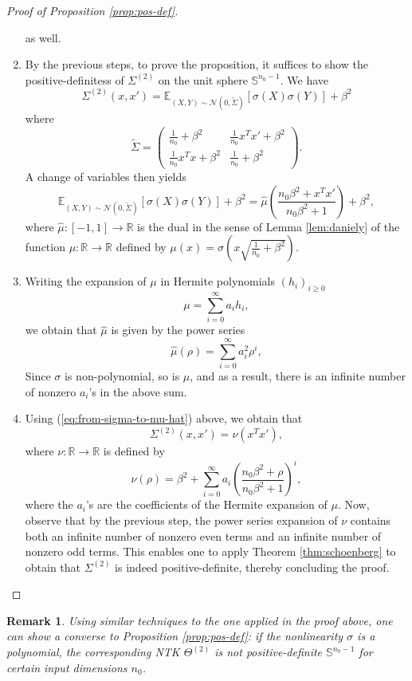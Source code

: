 \documentclass{article}
\newtheorem{rem}{Remark}
\begin{document}
\begin{proof}[Proof of Proposition \ref{prop:pos-def}]
\begin{enumerate}
as well.
\item By the previous steps, to prove the proposition, it suffices to show
the positive-definitess of $\Sigma^{\left(2\right)}$ on the unit
sphere $\mathbb{S}^{n_{0}-1}$. We have
\[
\Sigma^{\left(2\right)}\left(x,x'\right)=\mathbb{E}_{\left(X,Y\right)\sim\mathcal{N}\left(0,\tilde{\Sigma}\right)}\left[\sigma\left(X\right)\sigma\left(Y\right)\right]+\beta^{2}
\]
where 
\[
\tilde{\Sigma}=\left(\begin{array}{cc}
\frac{1}{n_{0}}+\beta^{2} & \frac{1}{n_{0}}x^{T}x'+\beta^{2}\\
\frac{1}{n_{0}}x^{T}x+\beta^{2} & \frac{1}{n_{0}}+\beta^{2}
\end{array}\right).
\]
A change of variables then yields 
\begin{equation}
\mathbb{E}_{\left(X,Y\right)\sim\mathcal{N}\left(0,\tilde{\Sigma}\right)}\left[\sigma\left(X\right)\sigma\left(Y\right)\right]+\beta^{2}=\hat{\mu}\left(\frac{n_{0}\beta^{2}+x^{T}x'}{n_{0}\beta^{2}+1}\right)+\beta^{2},\label{eq:from-sigma-to-mu-hat}
\end{equation}
where $\hat{\mu}:\left[-1,1\right]\to\mathbb{R}$ is the dual in the
sense of Lemma \ref{lem:daniely} of the function $\mu:\mathbb{R}\to\mathbb{R}$
defined by $\mu\left(x\right)=\sigma\left(x\sqrt{\frac{1}{n_{0}}+\beta^{2}}\right)$. 
\item Writing the expansion of $\mu$ in Hermite polynomials $\left(h_{i}\right)_{i\geq0}$
\[
\mu=\sum_{i=0}^{\infty}a_{i}h_{i},
\]
we obtain that $\hat{\mu}$ is given by the power series
\[
\hat{\mu}\left(\rho\right)=\sum_{i=0}^{\infty}a_{i}^{2}\rho^{i},
\]
Since $\sigma$ is non-polynomial, so is $\mu$, and as a result,
there is an infinite number of nonzero $a_{i}$'s in the above sum. 
\item Using (\ref{eq:from-sigma-to-mu-hat}) above, we obtain that 
\[
\Sigma^{\left(2\right)}\left(x,x'\right)=\nu\left(x^{T}x'\right),
\]
where $\nu:\mathbb{R}\to\mathbb{R}$ is defined by 
\[
\nu\left(\rho\right)=\beta^{2}+\sum_{i=0}^{\infty}a_{i}\left(\frac{n_{0}\beta^{2}+\rho}{n_{0}\beta^{2}+1}\right)^{i},
\]
where the $a_{i}$'s are the coefficients of the Hermite expansion
of $\mu$. Now, observe that by the previous step, the power series
expansion of $\nu$ contains both an infinite number of nonzero even
terms and an infinite number of nonzero odd terms. This enables one
to apply Theorem \ref{thm:schoenberg} to obtain that $\Sigma^{\left(2\right)}$
is indeed positive-definite, thereby concluding the proof. 
\end{enumerate}
\end{proof}
\begin{rem}
Using similar techniques to the one applied in the proof above, one
can show a converse to Proposition \ref{prop:pos-def}: if the nonlinearity
$\sigma$ is a polynomial, the corresponding NTK $\Theta^{\left(2\right)}$
is not positive-definite $\mathbb{S}^{n_{0}-1}$ for certain input
dimensions $n_{0}$.
\end{rem}
\end{document}
